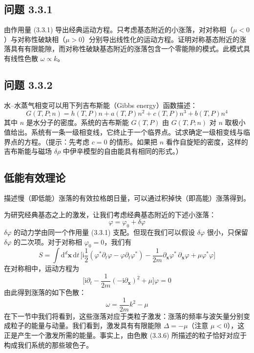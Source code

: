 \subsection*{问题 3.3.1}

由作用量 (3.3.1) 导出经典运动方程。只考虑基态附近的小涨落，对对称相（$\mu < 0$）与对称性破缺相（$\mu > 0$）分别导出线性化的运动方程。证明对称基态附近的涨落具有有限能隙，而对称性破缺基态附近的涨落包含一个零能隙的模式。此模式具有线性色散 $\omega \propto k$。

\subsection*{问题 3.3.2}

水–水蒸气相变可以用下列吉布斯能（Gibbs energy）函数描述：
\begin{equation*}
G(T,P;n) = h(T,P)n + a(T,P)n^2 + c(T,P)n^3 + b(T,P)n^4
\end{equation*}
其中 $n$ 是水分子的密度。系统的吉布斯能 $G(T,P)$ 由 $G(T,P;n)$ 对 $n$ 取极小值给出。系统有一条一级相变线，它终止于一个临界点。试求确定一级相变线与临界点的方程。（提示：先考虑 $c = 0$ 的情形。如果把 $n$ 看作自旋矩的密度，这样的吉布斯能与磁场 $\delta\rho$ 中伊辛模型的自由能具有相同的形式。）

\subsection{低能有效理论}

\begin{keypoints}
\item 描述慢（即低能）涨落的有效拉格朗日量，可以通过积掉快（即高能）涨落得到。
\end{keypoints}

为研究经典基态之上的激发，让我们考虑经典基态附近的下述小涨落：
\begin{equation*}
\varphi = \varphi_0 + \delta\varphi
\end{equation*}
$\delta\varphi$ 的动力学由同一个作用量 (3.3.1) 支配。但现在我们可以假设 $\delta\varphi$ 很小，只保留 $\delta\varphi$ 的二次项。对于对称相 $\varphi_0 = 0$，我们有
\begin{equation*}
S = \int \mathrm{d}^d\pmb{x}\,\mathrm{d}t\,\Big[\mathrm{i}\frac{1}{2}(\varphi^*\partial_t\varphi - \varphi\partial_t\varphi^*) - \frac{1}{2m}\partial_{\pmb{x}}\varphi^*\,\partial_{\pmb{x}}\varphi + \mu\varphi^*\varphi\Big]\tag{3.3.5}
\end{equation*}
在对称相中，运动方程为
\begin{equation*}
\Big[\mathrm{i}\partial_t - \frac{1}{2m}(-\mathrm{i}\partial_{\pmb{x}})^2 + \mu\Big]\varphi = 0
\end{equation*}
由此得到涨落的如下色散：
\begin{equation*}
\omega = \frac{1}{2m}k^2 - \mu\tag{3.3.6}
\end{equation*}
在下一节中我们将看到，这些涨落对应于类粒子激发：涨落的频率与波矢量分别变成粒子的能量与动量。我们看到，激发具有有限能隙 $\Delta = -\mu$（注意 $\mu < 0$），这正是产生一个激发所需的能量。事实上，由色散 (3.3.6) 所描述的粒子恰好对应于构成我们系统的那些玻色子。

